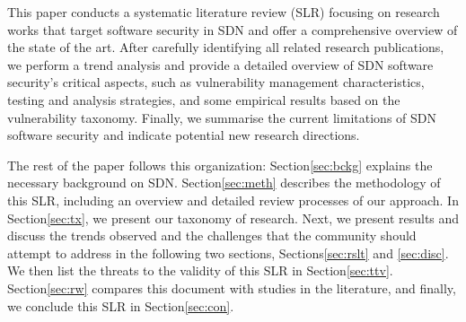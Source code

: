 This paper conducts a systematic literature review (SLR) focusing on research works that target software security in SDN and offer a comprehensive overview of the state of the art. After carefully identifying all related research publications, we perform a trend analysis and provide a detailed overview of SDN software security's critical aspects, such as vulnerability management characteristics, testing and analysis strategies, and some empirical results based on the vulnerability taxonomy. Finally, we summarise the current limitations of SDN software security and indicate potential new research directions.

The rest of the paper follows this organization: Section\ref{sec:bckg} explains the necessary background on SDN. Section\ref{sec:meth} describes the methodology of this SLR, including an overview and detailed review processes of our approach. In Section\ref{sec:tx}, we present our taxonomy of research. Next, we present results and discuss the trends observed and the challenges that the community should attempt to address in the following two sections, Sections\ref{sec:rslt} and \ref{sec:disc}. We then list the threats to the validity of this SLR in Section\ref{sec:ttv}. Section\ref{sec:rw} compares this document with studies in the literature, and finally, we conclude this SLR in Section\ref{sec:con}.

